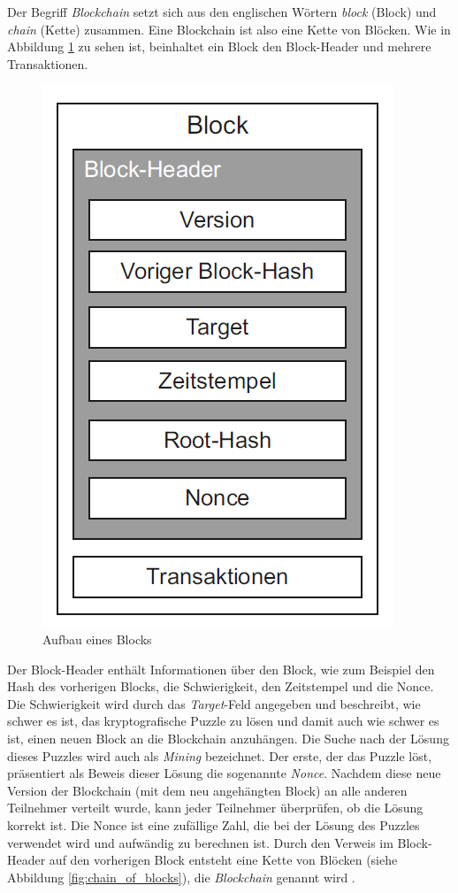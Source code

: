 Der Begriff \textit{Blockchain} setzt sich aus den englischen Wörtern \textit{block} (Block) und \textit{chain} (Kette) zusammen. Eine Blockchain ist also eine Kette von Blöcken. Wie in Abbildung \ref{fig:block} zu sehen ist, beinhaltet ein Block den Block-Header und mehrere Transaktionen. 

\begin{figure}[H]
    \centering
    \includegraphics[width=0.4\linewidth]{images/blockchain_block.png}
    \caption{Aufbau eines Blocks \parencite[S. 11]{Fill_BlockchainGrundlagen}}
    \label{fig:block}
\end{figure}


\noindent Der Block-Header enthält Informationen über den Block, wie zum Beispiel den Hash des vorherigen Blocks, die Schwierigkeit, den Zeitstempel und die Nonce. Die Schwierigkeit wird durch das \textit{Target}-Feld angegeben und beschreibt, wie schwer es ist, das kryptografische Puzzle zu lösen und damit auch wie schwer es ist, einen neuen Block an die Blockchain anzuhängen. Die Suche nach der Lösung dieses Puzzles wird auch als \textit{Mining} bezeichnet. Der erste, der das Puzzle löst, präsentiert als Beweis dieser Lösung die sogenannte \textit{Nonce}. Nachdem diese neue Version der Blockchain (mit dem neu angehängten Block) an alle anderen Teilnehmer verteilt wurde, kann jeder Teilnehmer überprüfen, ob die Lösung korrekt ist. Die Nonce ist eine zufällige Zahl, die bei der Lösung des Puzzles verwendet wird und aufwändig zu berechnen ist. Durch den Verweis im Block-Header auf den vorherigen Block entsteht eine Kette von Blöcken (siehe Abbildung \ref{fig:chain_of_blocks}), die \textit{Blockchain} genannt wird \parencite[S. 10-12]{Fill_BlockchainGrundlagen}.

